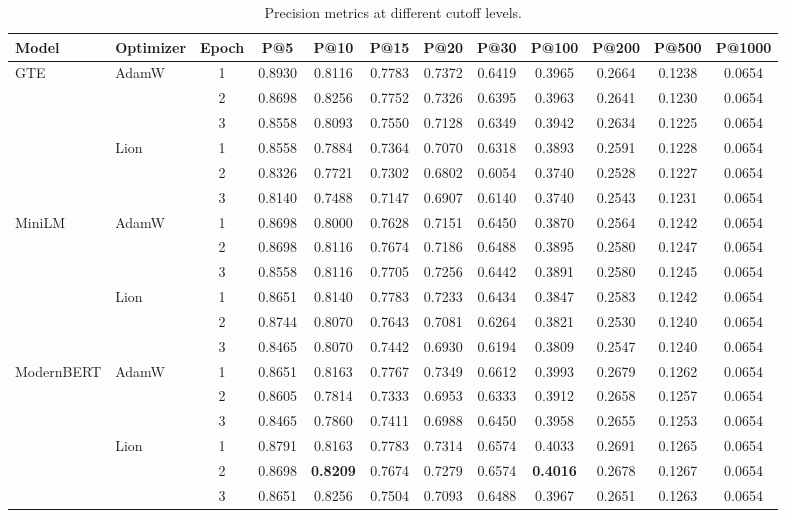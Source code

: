 \documentclass[conference]{IEEEtran}
\begin{document}
\begin{table}[t]
\centering
\caption{Precision metrics at different cutoff levels.}
\label{tab:precision_metrics}
\small
\begin{tabular}{llcccccccccc}
\toprule
\textbf{Model} & \textbf{Optimizer} & \textbf{Epoch} & \textbf{P@5} & \textbf{P@10} & \textbf{P@15} & \textbf{P@20} & \textbf{P@30} & \textbf{P@100} & \textbf{P@200} & \textbf{P@500} & \textbf{P@1000}\\
\midrule
\multirow{6}{*}{GTE} & \multirow{3}{*}{AdamW} 
 & 1 & 0.8930 & 0.8116 & 0.7783 & 0.7372 & 0.6419 & 0.3965 & 0.2664 & 0.1238 & 0.0654 \\
 & & 2 & 0.8698 & 0.8256 & 0.7752 & 0.7326 & 0.6395 & 0.3963 & 0.2641 & 0.1230 & 0.0654 \\
 & & 3 & 0.8558 & 0.8093 & 0.7550 & 0.7128 & 0.6349 & 0.3942 & 0.2634 & 0.1225 & 0.0654 \\
\cmidrule{2-12}
 & \multirow{3}{*}{Lion} 
 & 1 & 0.8558 & 0.7884 & 0.7364 & 0.7070 & 0.6318 & 0.3893 & 0.2591 & 0.1228 & 0.0654 \\
 & & 2 & 0.8326 & 0.7721 & 0.7302 & 0.6802 & 0.6054 & 0.3740 & 0.2528 & 0.1227 & 0.0654 \\
 & & 3 & 0.8140 & 0.7488 & 0.7147 & 0.6907 & 0.6140 & 0.3740 & 0.2543 & 0.1231 & 0.0654 \\
\midrule
\multirow{6}{*}{MiniLM} & \multirow{3}{*}{AdamW} 
 & 1 & 0.8698 & 0.8000 & 0.7628 & 0.7151 & 0.6450 & 0.3870 & 0.2564 & 0.1242 & 0.0654 \\
 & & 2 & 0.8698 & 0.8116 & 0.7674 & 0.7186 & 0.6488 & 0.3895 & 0.2580 & 0.1247 & 0.0654 \\
 & & 3 & 0.8558 & 0.8116 & 0.7705 & 0.7256 & 0.6442 & 0.3891 & 0.2580 & 0.1245 & 0.0654 \\
\cmidrule{2-12}
 & \multirow{3}{*}{Lion} 
 & 1 & 0.8651 & 0.8140 & 0.7783 & 0.7233 & 0.6434 & 0.3847 & 0.2583 & 0.1242 & 0.0654 \\
 & & 2 & 0.8744 & 0.8070 & 0.7643 & 0.7081 & 0.6264 & 0.3821 & 0.2530 & 0.1240 & 0.0654 \\
 & & 3 & 0.8465 & 0.8070 & 0.7442 & 0.6930 & 0.6194 & 0.3809 & 0.2547 & 0.1240 & 0.0654 \\
\midrule
\multirow{6}{*}{ModernBERT} & \multirow{3}{*}{AdamW} 
 & 1 & 0.8651 & 0.8163 & 0.7767 & 0.7349 & 0.6612 & 0.3993 & 0.2679 & 0.1262 & 0.0654\\
 & & 2 & 0.8605 & 0.7814 & 0.7333 & 0.6953 & 0.6333 & 0.3912 & 0.2658 & 0.1257 & 0.0654 \\
 & & 3 & 0.8465 & 0.7860 & 0.7411 & 0.6988 & 0.6450 & 0.3958 & 0.2655 & 0.1253 & 0.0654 \\
\cmidrule{2-12}
 & \multirow{3}{*}{Lion} 
 & 1 & 0.8791 & 0.8163 & 0.7783 & 0.7314 & 0.6574 & 0.4033 & 0.2691 & 0.1265 & 0.0654\\
 & & 2 & 0.8698 & \textbf{0.8209} & 0.7674 & 0.7279 & 0.6574 & \textbf{0.4016} & 0.2678 & 0.1267 & 0.0654\\
 & & 3 & 0.8651 & 0.8256 & 0.7504 & 0.7093 & 0.6488 & 0.3967 & 0.2651 & 0.1263 & 0.0654 \\
\bottomrule
\end{tabular}
\end{table}
\end{document}
